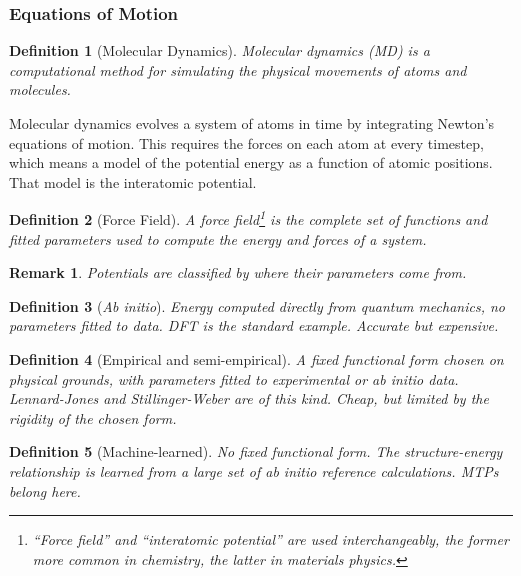 \documentclass{article}
\newtheorem{definition}{Definition}
\newtheorem{remark}{Remark}
\begin{document}
\subsubsection{Equations of Motion}
\begin{definition}[Molecular Dynamics]
    Molecular dynamics (MD) is a computational method for simulating the physical movements of atoms and molecules.
\end{definition}
Molecular dynamics evolves a system of atoms in time by integrating Newton's equations of motion. This requires the forces on each atom at every timestep, which means a model of the potential energy as a function of atomic positions. That model is the interatomic potential.
\begin{definition}[Force Field]
    A force field\footnote{``Force field'' and ``interatomic potential'' are used interchangeably, the former more common in chemistry, the latter in materials physics.} is the complete set of functions and fitted parameters used to compute the energy and forces of a system.
\end{definition}
\begin{remark}
    Potentials are classified by where their parameters come from.
\end{remark}
\begin{definition}[\textit{Ab initio}]
    Energy computed directly from quantum mechanics, no parameters fitted to data. DFT is the standard example. Accurate but expensive.
\end{definition}
\begin{definition}[Empirical and semi-empirical]
    A fixed functional form chosen on physical grounds, with parameters fitted to experimental or \textit{ab initio} data. Lennard-Jones and Stillinger-Weber are of this kind. Cheap, but limited by the rigidity of the chosen form.
\end{definition}
\begin{definition}[Machine-learned]
    No fixed functional form. The structure-energy relationship is learned from a large set of \textit{ab initio} reference calculations. MTPs belong here.
\end{definition}
\end{document}

